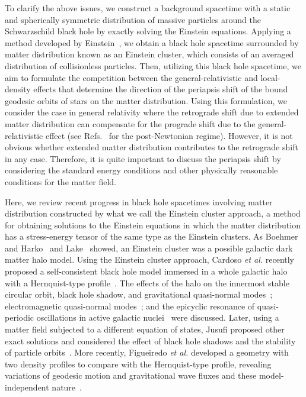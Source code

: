 \documentclass[aps,11pt,nofootinbib,preprintnumbers,groupedaddress,superscriptaddress]{revtex4-2}
\begin{document}
To clarify the above issues, we construct a background spacetime with a static and spherically symmetric distribution of massive particles
around the Schwarzschild black hole by exactly solving the Einstein equations.
Applying a method developed by Einstein~\cite{Einstein:1939, Geralico:2012jt}, 
we obtain a black hole spacetime surrounded by matter distribution known as an Einstein cluster, which 
consists of an averaged distribution of collisionless particles. 
Then, utilizing this black hole spacetime, we aim to formulate the competition between 
the general-relativistic and 
local-density effects that determine the direction of the 
periapsis shift
of the bound
geodesic orbits of stars on the matter distribution.
Using this formulation,
we consider the case in general relativity where the retrograde shift due to extended matter distribution can compensate for the prograde shift due to the
general-relativistic effect (see Refs.~\cite{Rubilar:2001,Nucita:2007qp, Zakharov:2007fj,
Iwata:2016ivt} for the post-Newtonian regime). 
However, it is not obvious whether extended matter distribution 
contributes to the retrograde shift in any case.
Therefore, it is quite important to discuss the 
periapsis shift
by considering the standard energy conditions and other physically reasonable conditions for the matter field. 

Here, we review recent progress in black hole spacetimes 
involving matter distribution constructed by what we call the Einstein cluster approach, 
a method for obtaining solutions to the Einstein equations in which the matter distribution has 
a stress-energy tensor of the same type as the Einstein clusters. 
As Boehmer and Harko~\cite{Boehmer:2007az} and Lake~\cite{Lake:2006pp} showed, 
an Einstein cluster was a possible galactic dark matter halo model. 
Using the Einstein cluster approach, 
Cardoso \textit{et al.} recently proposed a self-consistent black hole model immersed 
in a whole galactic halo with a Hernquist-type profile~\cite{Cardoso:2021wlq}.  
The effects of the halo on 
the innermost stable circular orbit, black hole shadow, and gravitational quasi-normal modes~\cite{Cardoso:2021wlq}; 
electromagnetic quasi-normal modes~\cite{Konoplya:2021ube}; 
and the epicyclic resonance of quasi-periodic oscillations in active galactic nuclei~\cite{Stuchlik:2021gwg} were discussed. 
Later, using a matter field subjected to a different equation of states, 
Jusufi proposed other exact solutions and considered the effect of black hole shadows and the stability of particle orbits~\cite{Jusufi:2022jxu}. 
More recently, Figueiredo \textit{et al.} developed a geometry with two density profiles to compare 
with the Hernquist-type profile, revealing variations of geodesic motion and gravitational wave fluxes 
and these model-independent nature~\cite{Figueiredo:2023gas}. 
\end{document}
